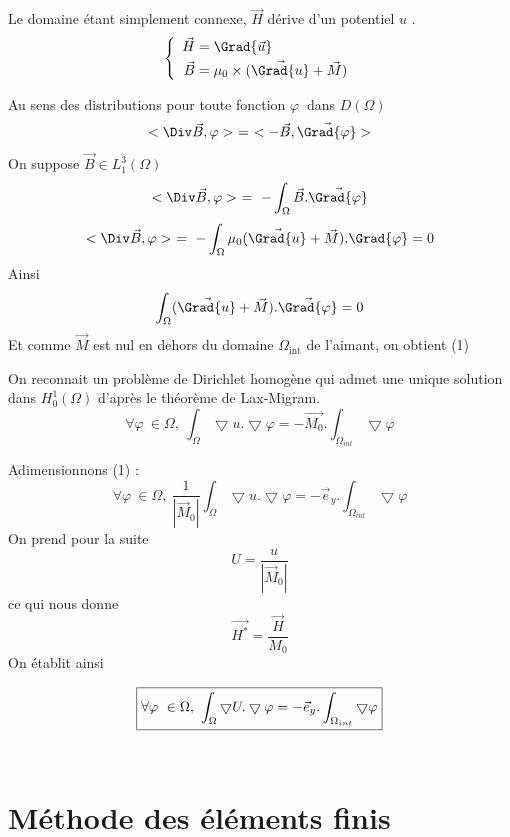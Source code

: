 \documentclass[a4paper,12pt,titlepage]{report}
\begin{document}
\begin{onehalfspace}
Le domaine étant simplement connexe, $\vec{H}$ dérive d'un potentiel $u$	.
\[
	\left\{
	\begin{array}{ccc}		
	\begin{aligned}
		\vec{H} &= \Grad{\vec{u}} \\
		\vec{B} &= \mu_{0}\times(\vec{\Grad{u}}+\vec{M})
	\end{aligned}
	\end{array}
	\right.
\]

Au sens des distributions pour toute fonction $\varphi\ $  dans $D(\Omega)$	
\[<\Div\vec{B},\varphi> \ = \ <-\vec{B},\vec{\Grad{\varphi}}>\]
On suppose $\vec{B} \in L^{3}_{1}(\Omega)$
\[<\Div\vec{B},\varphi> \ = \  -\int_{\Omega}\vec{B}. \vec{\Grad{\varphi}}\]
\[<\Div\vec{B},\varphi> \ = \ -\int_{\Omega}\mu_{0}(\vec{\Grad{u}}+\vec{M}) .{\Grad{\varphi}} = 0\]
Ainsi
\[\int_{\Omega}(\vec{\Grad{u}}+\vec{M}) . \vec{\Grad{\varphi}} = 0\]
Et comme $\vec{M}$ est nul en dehors du domaine $\Omega_{\text{int}}$ de l'aimant, on obtient (1)

On reconnait un problème de Dirichlet homogène qui admet une unique solution dans $H_{0}^{1}(\Omega)$ d'après le théorème de Lax-Migram.
\begin{equation}
\label{E}
\forall \varphi\ \in \Omega, \ \int_{\Omega}\bigtriangledown u .\bigtriangledown{\varphi} = -\vec{M_{0}}. \int_{\Omega_{int}}\bigtriangledown\varphi
\end{equation}

Adimensionnons (1)				:
\[
	\forall \varphi\  \in \Omega,\  \frac{1}{|\vec{M}_{0}|}\int_{\Omega}\bigtriangledown u.\bigtriangledown \varphi
	= -\vec{e}_{y}.\int_{\Omega_{int}}\bigtriangledown \varphi
\]
On prend pour la suite \[U =  \frac{u}{|\vec{M}_{0}|}  \] ce qui nous donne \[\vec{H^*} =\frac{\vec{H}}{M_0} \]
On établit ainsi \label{A}

\begin{equation}
\boxed{
\label{A}
	\forall \varphi\  \in \Omega,\ \int_{\Omega}\bigtriangledown U.\bigtriangledown \varphi
	=- \vec{e}_{y}.\int_{\Omega_{int}}\bigtriangledown \varphi}
\end{equation}
\\

\section{Méthode des éléments finis}


\end{onehalfspace}
\end{document}
